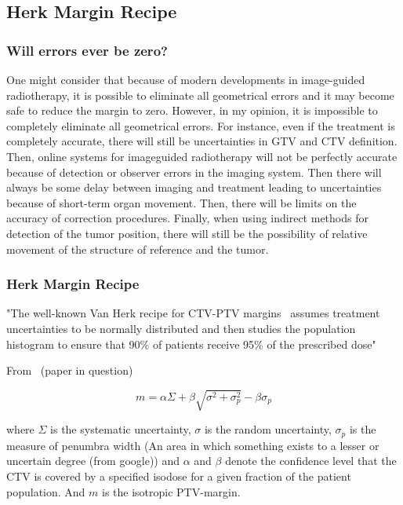 \documentclass[11pt]{article}
\begin{document}
\subsection{Herk Margin Recipe} \label{term:herk-margin-recipe}

\subsubsection{Will errors ever be zero?}

One might consider that because of modern developments in image-guided radiotherapy, it is possible to eliminate all geometrical errors and it may become safe to reduce the margin to zero. However, in my opinion, it is impossible to completely eliminate all geometrical errors. For instance, even if the treatment is completely accurate, there will still be uncertainties in GTV and CTV definition. Then, online systems for imageguided radiotherapy will not be perfectly accurate because of detection or observer errors in the imaging system. Then there will always be some delay between imaging and treatment leading to uncertainties because of short-term organ movement. Then, there will be limits on the accuracy of correction procedures. Finally, when using indirect methods for detection of the tumor position, there will still be the possibility of relative movement of the structure of reference and the tumor.~\cite{van-herk-margin-recipe}

\subsubsection{Herk Margin Recipe}

"The well-known Van Herk recipe for CTV-PTV margins~\cite{van-herk-margin-recipe2} assumes treatment uncertainties to be normally distributed and then studies the population histogram to ensure that 90\% of patients receive 95\% of the prescribed dose"~\cite{van-herk-margin-recipe3}~\cite{van-herk-margin-recipe2}

From~\cite{personalised-PTV-strategies} (paper in question)

\begin{equation}
    m = \alpha \Sigma + \beta \sqrt{\sigma^2 + \sigma^2_p} - \beta \sigma_p
\end{equation}

where $\Sigma$ is the systematic uncertainty, $\sigma$ is the random uncertainty, $\sigma_p$ is the measure of penumbra width (An area in which something exists to a lesser or uncertain degree (from google)) and $\alpha$ and $\beta$ denote the confidence level that the CTV is covered by a specified isodose for a given fraction of the patient population. And $m$ is the isotropic PTV-margin.
\end{document}
